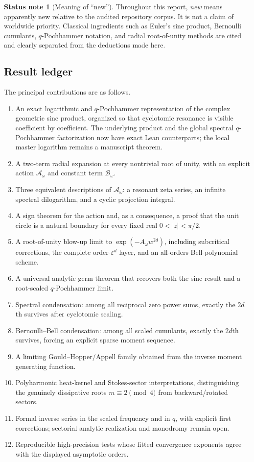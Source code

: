 \documentclass[11pt]{article}
\theoremstyle{definition}
\newtheorem{status}[theorem]{Status note}
\begin{document}
\begin{status}[Meaning of ``new'']
Throughout this report, \emph{new} means apparently new relative to the audited repository corpus.  It is not a claim of worldwide priority.  Classical ingredients such as Euler's sine product, Bernoulli cumulants, $q$-Pochhammer notation, and radial root-of-unity methods are cited and clearly separated from the deductions made here.
\end{status}

\subsection{Result ledger}

The principal contributions are as follows.
\begin{enumerate}[label=\textbf{R\arabic*.},leftmargin=3.4em]
\item An exact logarithmic and $q$-Pochhammer representation of the complex geometric sinc product, organized so that cyclotomic resonance is visible coefficient by coefficient.  The underlying product and the global spectral $q$-Pochhammer factorization now have exact Lean counterparts; the local master logarithm remains a manuscript theorem.
\item A two-term radial expansion at every nontrivial root of unity, with an explicit action $\mathscr A_\omega$ and constant term $\mathscr B_\omega$.
\item Three equivalent descriptions of $\mathscr A_\omega$: a resonant zeta series, an infinite spectral dilogarithm, and a cyclic projection integral.
\item A sign theorem for the action and, as a consequence, a proof that the unit circle is a natural boundary for every fixed real $0<|z|<\pi/2$.
\item A root-of-unity blow-up limit to $\exp(-A_\omega w^{2d})$, including subcritical corrections, the complete order-$\varepsilon^d$ layer, and an all-orders Bell-polynomial scheme.
\item A universal analytic-germ theorem that recovers both the sinc result and a root-scaled $q$-Pochhammer limit.
\item Spectral condensation: among all reciprocal zero power sums, exactly the $2d$th survives after cyclotomic scaling.
\item Bernoulli--Bell condensation: among all scaled cumulants, exactly the $2d$th survives, forcing an explicit sparse moment sequence.
\item A limiting Gould--Hopper/Appell family obtained from the inverse moment generating function.
\item Polyharmonic heat-kernel and Stokes-sector interpretations, distinguishing the genuinely dissipative roots $m\equiv2\pmod4$ from backward/rotated sectors.
\item Formal inverse series in the scaled frequency and in $q$, with explicit first corrections; sectorial analytic realization and monodromy remain open.
\item Reproducible high-precision tests whose fitted convergence exponents agree with the displayed asymptotic orders.
\end{enumerate}
\end{document}

